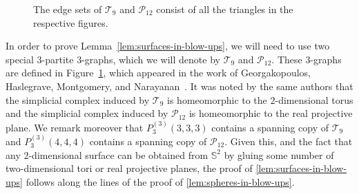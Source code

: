 \documentclass[12pt,reqno]{amsart}
\theoremstyle{plain}
\theoremstyle{definition}
\numberwithin{equation}{section}
\newcommand{\cP}{\mathcal{P}}
\newcommand{\cT}{\mathcal{T}}
\begin{document}
\begin{figure}
\begin{center}
		\end{center}
		\label{fig:torus-projective-plane}
		\caption{The edge sets of $\cT_{9}$ and $\cP_{12}$ consist of all the triangles in the respective figures.}\label{fig:degen-col}
	\end{figure}
	
	In order to prove Lemma~\ref{lem:surfaces-in-blow-ups}, we will need to use two special $3$-partite $3$-graphs, which we will denote by $\cT_9$ and $\cP_{12}$. These $3$-graphs are defined in Figure~\ref{fig:degen-col}, which appeared in the work of Georgakopoulos, Haslegrave, Montgomery, and Narayanan~\cite{Min2DegSS}. It was noted by the same authors that the simplicial complex induced by $\cT_9$ is homeomorphic to the $2$-dimensional torus and the simplicial complex induced by $\cP_{12}$ is homeomorphic to the real projective plane. We remark moreover that $P_{3}^{(3)}(3,3,3)$ contains a spanning copy of $\cT_9$ and $P_{3}^{(3)}(4,4,4)$ contains a spanning copy of $\cP_{12}$. Given this, and the fact that any $2$-dimensional surface can be obtained from $\mathbb{S}^2$ by gluing some number of two-dimensional tori or real projective planes, the proof of \cref{lem:surfaces-in-blow-ups} follows along the lines of the proof of \cref{lem:spheres-in-blow-ups}.
\end{document}
